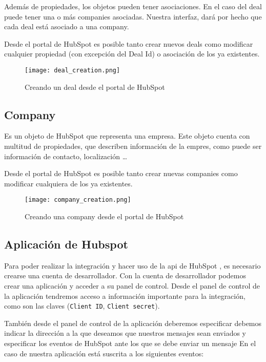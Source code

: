			
			
		Además de propiedades, los objetos pueden tener asociaciones. En el caso del deal puede tener una o más companies asociadas. Nuestra interfaz, dará por hecho que cada deal está asociado a una company.
			
		Desde el portal de HubSpot es posible tanto crear nuevos deals como modificar cualquier propiedad (con excepción del Deal Id) o asociación de los ya existentes.
		
		\begin{figure}
			\centering
			\texttt{[image: deal\_creation.png]}
			\caption{Creando un deal desde el portal de HubSpot}
		\end{figure}

\subsection{Company}
		
		Es un objeto de HubSpot que representa una empresa. Este objeto cuenta con multitud de propiedades, que describen información de la empres, como puede ser información de contacto, localización \ldots 
		
		Desde el portal de HubSpot es posible tanto crear nuevas companies como modificar cualquiera de los ya existentes.
		
		\begin{figure}
			\centering
			\texttt{[image: company\_creation.png]}
			\caption{Creando una company desde el portal de HubSpot}
		\end{figure}


\subsection{Aplicación de Hubspot}
\label{subsec:app_hs}
Para poder realizar la integración y hacer uso de la \acrshort{api} de HubSpot \cite{hsapi}, es necesario crearse una cuenta de desarrollador. Con la cuenta de desarrollador podemos crear una aplicación y acceder a su panel de control. 
Desde el panel de control de la aplicación tendremos acceso a información importante para la integración, como son las claves (\verb|Client ID|, \verb|Client secret|).


También desde el panel de control de la aplicación deberemos especificar debemos indicar la dirección a la que deseamos que nuestros mensajes sean enviados y especificar los eventos de HubSpot ante los que se debe enviar un mensaje
En el caso de nuestra aplicación está suscrita a los siguientes eventos:

